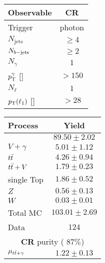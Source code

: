 		\begin{table}[!htb]
			\parbox{.5\linewidth}{
			\centering
			\label{tab:CRcuts}
		   	\begin{tabular}{lc}
					\toprule
					\textbf{Observable} & \textbf{CR}\boldmath{$\gamma$} \\
					\midrule
					Trigger & photon\\
					$N_{\mathrm{jets}}$ & $\geq 4$ \\ 
					$N_{b\mathrm{-jets}}$ & $\geq 2$ \\ \midrule
					$N_\gamma$ & $1$ \\ 
					$p_{\mathrm{T}}^{\gamma}$ [\GeV] & $>150$ \\
					$N_\ell$ & $1$ \\ 
					$p_{\mathrm{T}}(\ell_1)$ [\GeV] & $>28$ \\ \bottomrule
			  \end{tabular}
			}
			\hfill
			\parbox{.5\linewidth}{
			\centering
			\label{tab:CRgamma_yields}
				\begin{tabular}{lc}
					\toprule
					\textbf{Process} & \textbf{Yield} \\
					\toprule
					\ttgamma & $89.50 \pm 2.02$ \\
					$V+\gamma$ & $5.01 \pm 1.12$ \\
					$t\bar{t}$ & $4.26 \pm 0.94$ \\
					$t\bar{t}+V$ & $1.79 \pm 0.23$ \\
					single Top & $1.86 \pm 0.52$ \\
					$Z$ & $0.56 \pm 0.13$ \\
					$W$ & $0.03 \pm 0.01$ \\
					\midrule
					Total MC & $103.01 \pm 2.69$ \\
					Data & $124$ \\
					\midrule
					\multicolumn{2}{c}{\textbf{CR}{\bm{$\gamma$} purity} ( $87\%$)} \\ 
					\midrule
					$\mu_{t\bar{t}+\gamma}$ & $1.22 \pm 0.13$ \\
					\bottomrule
				\end{tabular}
			}
		\end{table}

